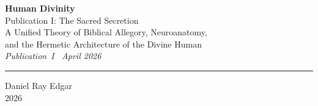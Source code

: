 \documentclass[12pt, a4paper]{article}
\begin{document}

\begin{titlepage}
  \centering
  \vspace*{2cm}

  {\LARGE\bfseries Human Divinity}\\[0.8em]
  {\large Publication I: The Sacred Secretion}\\[0.4em]
  {\large A Unified Theory of Biblical Allegory, Neuroanatomy,\\
  and the Hermetic Architecture of the Divine Human}
  \\[0.6em]
  {\normalsize\itshape Publication~I \textbullet\ April 2026}

  \vspace{2cm}
  \rule{0.5\linewidth}{0.5pt}
  \vspace{2cm}

  \vspace{0.5cm}
  {\large Daniel Ray Edgar}\\[0.4em]
  {\normalsize 2026}

  \vfill


\end{titlepage}
\end{document}
